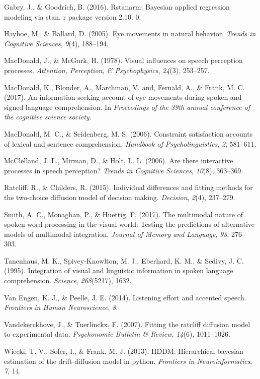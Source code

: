 \documentclass[10pt, letterpaper]{article}
\begin{document}
\hypertarget{ref-gabry2016rstanarm}{}
Gabry, J., \& Goodrich, B. (2016). Rstanarm: Bayesian applied regression
modeling via stan. r package version 2.10. 0.

\hypertarget{ref-hayhoe2005eye}{}
Hayhoe, M., \& Ballard, D. (2005). Eye movements in natural behavior.
\emph{Trends in Cognitive Sciences}, \emph{9}(4), 188--194.

\hypertarget{ref-macdonald1978visual}{}
MacDonald, J., \& McGurk, H. (1978). Visual influences on speech
perception processes. \emph{Attention, Perception, \& Psychophysics},
\emph{24}(3), 253--257.

\hypertarget{ref-macdonald2017info}{}
MacDonald, K., Blonder, A., Marchman, V. and, Fernald, A., \& Frank, M.
C. (2017). An information-seeking account of eye movements during spoken
and signed language comprehension. In \emph{Proceedings of the 39th
annual conference of the cognitive science society}.

\hypertarget{ref-macdonald2006constraint}{}
MacDonald, M. C., \& Seidenberg, M. S. (2006). Constraint satisfaction
accounts of lexical and sentence comprehension. \emph{Handbook of
Psycholinguistics}, \emph{2}, 581--611.

\hypertarget{ref-mcclelland2006there}{}
McClelland, J. L., Mirman, D., \& Holt, L. L. (2006). Are there
interactive processes in speech perception? \emph{Trends in Cognitive
Sciences}, \emph{10}(8), 363--369.

\hypertarget{ref-ratcliff2015individual}{}
Ratcliff, R., \& Childers, R. (2015). Individual differences and fitting
methods for the two-choice diffusion model of decision making.
\emph{Decision}, \emph{2}(4), 237--279.

\hypertarget{ref-smith2017multimodal}{}
Smith, A. C., Monaghan, P., \& Huettig, F. (2017). The multimodal nature
of spoken word processing in the visual world: Testing the predictions
of alternative models of multimodal integration. \emph{Journal of Memory
and Language}, \emph{93}, 276--303.

\hypertarget{ref-tanenhaus1995integration}{}
Tanenhaus, M. K., Spivey-Knowlton, M. J., Eberhard, K. M., \& Sedivy, J.
C. (1995). Integration of visual and linguistic information in spoken
language comprehension. \emph{Science}, \emph{268}(5217), 1632.

\hypertarget{ref-van2014listening}{}
Van Engen, K. J., \& Peelle, J. E. (2014). Listening effort and accented
speech. \emph{Frontiers in Human Neuroscience}, \emph{8}.

\hypertarget{ref-vandekerckhove2007fitting}{}
Vandekerckhove, J., \& Tuerlinckx, F. (2007). Fitting the ratcliff
diffusion model to experimental data. \emph{Psychonomic Bulletin \&
Review}, \emph{14}(6), 1011--1026.

\hypertarget{ref-wiecki2013hddm}{}
Wiecki, T. V., Sofer, I., \& Frank, M. J. (2013). HDDM: Hierarchical
bayesian estimation of the drift-diffusion model in python.
\emph{Frontiers in Neuroinformatics}, \emph{7}, 14.
\end{document}
